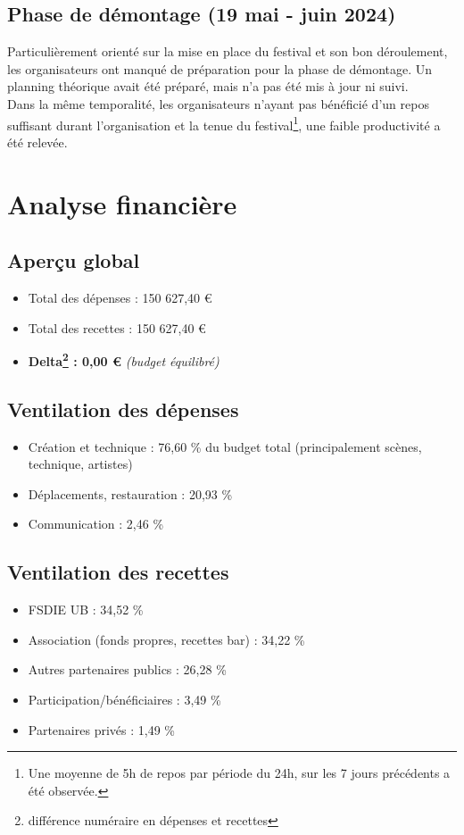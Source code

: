 \documentclass[12pt,a4paper]{report}
\begin{document}
\section{Phase de démontage (19 mai - juin 2024)}

Particulièrement orienté sur la mise en place du festival et son bon déroulement, les organisateurs ont manqué de préparation pour la phase de démontage. Un planning théorique avait été préparé, mais n'a pas été mis à jour ni suivi.\\

Dans la même temporalité, les organisateurs n'ayant pas bénéficié d'un repos suffisant durant l'organisation et la tenue du festival\footnote{Une moyenne de 5h de repos par période du 24h, sur les 7 jours précédents a été observée.}, une faible productivité a été relevée.

\chapter{Analyse financière}

\section{Aperçu global}
\begin{itemize}
\item Total des dépenses : 150 627,40 €
\item Total des recettes : 150 627,40 €
\item \textbf{Delta\footnote{différence numéraire en dépenses et recettes} : 0,00 €} \textit{(budget équilibré)}
\end{itemize}

\section{Ventilation des dépenses}
\begin{itemize}
\item Création et technique : 76,60 \% du budget total (principalement scènes, technique, artistes)
\item Déplacements, restauration : 20,93 \%
\item Communication : 2,46 \%
\end{itemize}

\section{Ventilation des recettes}
\begin{itemize}
\item FSDIE UB : 34,52 \%
\item Association (fonds propres, recettes bar) : 34,22 \%
\item Autres partenaires publics : 26,28 \%
\item Participation/bénéficiaires : 3,49 \%
\item Partenaires privés : 1,49 \%\\
\end{itemize}
\end{document}
